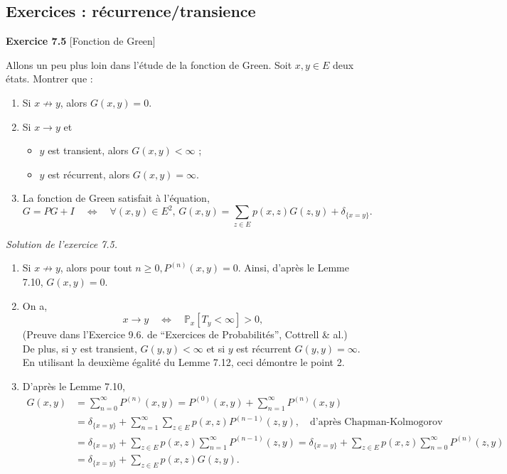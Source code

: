 \newpage

\subsection{Exercices : récurrence/transience}
\vspace{5mm}
\textbf{Exercice 7.5} [Fonction de Green]

\noindent Allons un peu plus loin dans l’étude de la fonction de Green. Soit $x, y \in E$ deux états. Montrer que :
\begin{enumerate}
    \item Si $x \not\to y$, alors $G(x, y) = 0$.
    \item Si $x \to y$ et
    \begin{itemize}
        \item $y$ est transient, alors $G(x, y) < \infty$ ;
        \item $y$ est récurrent, alors $G(x, y) = \infty$.
    \end{itemize}
    \item La fonction de Green satisfait à l'équation,
    \[
    G = PG + I \quad \Leftrightarrow \quad \forall (x, y) \in E^2, \, G(x, y) = \sum_{z \in E} p(x, z)G(z, y) + \delta_{\{x=y\}}.
    \]
\end{enumerate}

\noindent \textit{Solution de l’exercice 7.5.}\\
\begin{enumerate}
    \item Si \(x \not\to y\), alors pour tout \(n \geq 0, P^{(n)}(x, y) = 0\). Ainsi, d’après le Lemme 7.10, \(G(x, y) = 0\).
    \item On a,
    \[
    x \to y \quad \Leftrightarrow \quad \mathbb{P}_x [T_y < \infty] > 0,
    \]
    (Preuve dans l’Exercice 9.6. de “Exercices de Probabilités”, Cottrell \& al.)\\
    De plus, si y est transient, \(G(y, y) < \infty\) et si \(y\) est récurrent \(G(y, y) = \infty\). En utilisant la deuxième égalité du Lemme 7.12, ceci démontre le point 2.
    \item D’après le Lemme 7.10,
    \begin{align*}
        G(x, y) &= \sum_{n=0}^\infty P^{(n)}(x, y) = P^{(0)}(x, y) + \sum_{n=1}^\infty P^{(n)}(x, y) \\
        &= \delta_{\{x=y\}} + \sum_{n=1}^\infty \sum_{z \in E} p(x, z) P^{(n-1)}(z, y), \quad \text{d'après Chapman-Kolmogorov} \\
        &= \delta_{\{x=y\}} + \sum_{z \in E} p(x, z) \sum_{n=1}^\infty P^{(n-1)}(z, y) = \delta_{\{x=y\}} + \sum_{z \in E} p(x, z) \sum_{n=0}^\infty P^{(n)}(z, y) \\
        &= \delta_{\{x=y\}} + \sum_{z \in E} p(x, z) G(z, y).
    \end{align*}
\end{enumerate}


